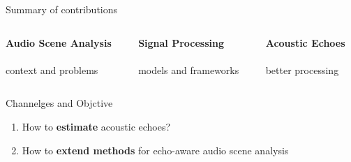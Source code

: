 \begin{frame}{Summary of contributions}

    \begin{columns}[onlytextwidth]
        \begin{column}[T]{0.3\linewidth}
            \centering
            \textbf{Audio Scene Analysis}
            \\\downarrow
            \\context and problems
        \end{column}\hfill
        \begin{column}[T]{0.3\linewidth}
            \centering
            \textbf{Signal Processing}
            \\\downarrow
            \\models and frameworks
        \end{column}\hfill
        \begin{column}[T]{0.3\linewidth}
            \centering
            \textbf{Acoustic Echoes}
            \\\downarrow
            \\better processing
        \end{column}\hfill
    \end{columns}

    \vfill
    \begin{mydefblock}{Channelges and Objctive}
        \begin{enumerate}
            \item How to \textbf{estimate} acoustic echoes?
            \item How to \textbf{extend methods} for echo-aware audio scene analysis
        \end{enumerate}
    \end{mydefblock}


\end{frame}
